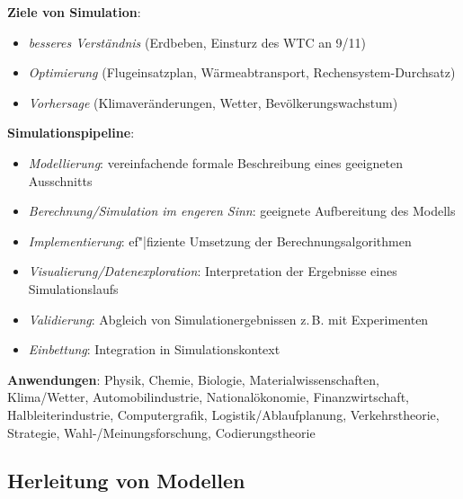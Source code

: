 \textbf{Ziele von Simulation}:
\begin{itemize}
    \item
    \emph{besseres Verständnis}
    (Erdbeben, Einsturz des WTC an 9/11)

    \item
    \emph{Optimierung}
    (Flugeinsatzplan, Wärmeabtransport, Rechensystem-Durchsatz)

    \item
    \emph{Vorhersage}
    (Klimaveränderungen, Wetter, Bevölkerungswachstum)
\end{itemize}

\linie

\textbf{Simulationspipeline}:
\begin{itemize}
    \item
    \emph{Modellierung}:
    vereinfachende formale Beschreibung eines geeigneten Ausschnitts

    \item
    \emph{Berechnung/Simulation im engeren Sinn}:
    geeignete Aufbereitung des Modells

    \item
    \emph{Implementierung}:
    ef"|fiziente Umsetzung der Berechnungsalgorithmen

    \item
    \emph{Visualierung/Datenexploration}:
    Interpretation der Ergebnisse eines Simulationslaufs

    \item
    \emph{Validierung}:
    Abgleich von Simulationergebnissen z.\,B. mit Experimenten

    \item
    \emph{Einbettung}:
    Integration in Simulationskontext
\end{itemize}

\linie

\textbf{Anwendungen}:
Physik,
Chemie,
Biologie,
Materialwissenschaften,
Klima/Wetter,
Automobilindustrie,
Nationalökonomie,
Finanzwirtschaft,
Halbleiterindustrie,
Computergrafik,
Logistik/Ablaufplanung,
Verkehrstheorie,
Strategie,
Wahl-/Meinungsforschung,
Codierungstheorie

\pagebreak

\subsection{%
    Herleitung von Modellen%
}

